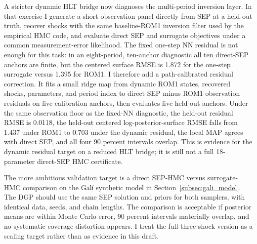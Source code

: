 \documentclass[12pt]{article}
\theoremstyle{plain}
\theoremstyle{definition}
\theoremstyle{remark}
\begin{document}
A stricter dynamic HLT bridge now diagnoses the multi-period inversion layer. In that exercise I generate a short observation panel directly from SEP at a held-out truth, recover shocks with the same baseline-ROM1 inversion filter used by the empirical HMC code, and evaluate direct SEP and surrogate objectives under a common measurement-error likelihood. The fixed one-step NN residual is not enough for this task: in an eight-period, ten-anchor diagnostic all ten direct-SEP anchors are finite, but the centered surface RMSE is 1.872 for the one-step surrogate versus 1.395 for ROM1. I therefore add a path-calibrated residual correction. It fits a small ridge map from dynamic ROM1 states, recovered shocks, parameters, and period index to direct SEP minus ROM1 observation residuals on five calibration anchors, then evaluates five held-out anchors. Under the same observation floor as the fixed-NN diagnostic, the held-out residual RMSE is 0.0118, the held-out centered log-posterior-surface RMSE falls from 1.437 under ROM1 to 0.703 under the dynamic residual, the local MAP agrees with direct SEP, and all four 90 percent intervals overlap. This is evidence for the dynamic residual target on a reduced HLT bridge; it is still not a full 18-parameter direct-SEP HMC certificate.

The more ambitious validation target is a direct SEP-HMC versus surrogate-HMC comparison on the Gal\'i synthetic model in Section~\ref{subsec:gali_model}. The DGP should use the same SEP solution and priors for both samplers, with identical data, seeds, and chain lengths. The comparison is acceptable if posterior means are within Monte Carlo error, 90 percent intervals materially overlap, and no systematic coverage distortion appears. I treat the full three-shock version as a scaling target rather than as evidence in this draft.
\end{document}
